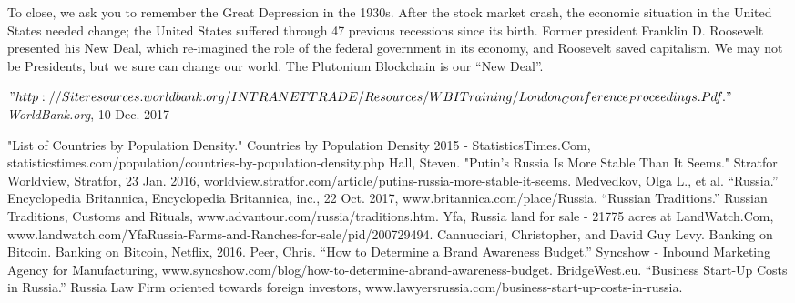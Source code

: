 \documentclass[12pt]{article}
\begin{document}
To close, we ask you to remember the Great Depression in the 1930s. After the stock market crash, the economic situation in the United States needed change; the United States suffered through 47 previous recessions since its birth. Former president Franklin D. Roosevelt presented his New Deal, which re-imagined the role of the federal government in its economy, and Roosevelt saved capitalism. We may not be Presidents, but we sure can change our world. The Plutonium Blockchain is our ``New Deal''.
\pagebreak
\begin{thebibliography}{10}
\tiny $"http://Siteresources.worldbank.org/INTRANETTRADE/Resources/WBITraining/London_Conference_Proceedings.Pdf."$ \normalsize \textit{WorldBank.org}, 10 Dec. 2017
 
 "List of Countries by Population Density." Countries by Population Density 2015 -
StatisticsTimes.Com, \tiny statisticstimes.com/population/countries-by-population-density.php
 \normalsize
{} 
Hall, Steven. "Putin's Russia Is More Stable Than It Seems." Stratfor Worldview, Stratfor,
23 Jan. 2016, \tiny worldview.stratfor.com/article/putins-russia-more-stable-it-seems.
\normalsize
{}
Medvedkov, Olga L., et al. ``Russia.'' Encyclopedia Britannica, Encyclopedia Britannica,
inc., 22 Oct. 2017, \tiny www.britannica.com/place/Russia.
\normalsize
{}
``Russian Traditions.'' Russian Traditions, Customs and Rituals,
\tiny www.advantour.com/russia/traditions.htm.
\normalsize
{}
Yfa, Russia land for sale - 21775 acres at LandWatch.Com, \tiny www.landwatch.com/YfaRussia-Farms-and-Ranches-for-sale/pid/200729494.
\normalsize
{}
Cannucciari, Christopher, and David Guy Levy. Banking on Bitcoin. Banking on Bitcoin,
Netflix, 2016.
Peer, Chris. “How to Determine a Brand Awareness Budget.” Syncshow - Inbound
Marketing Agency for Manufacturing, \tiny www.syncshow.com/blog/how-to-determine-abrand-awareness-budget.
\normalsize
{}
BridgeWest.eu. “Business Start-Up Costs in Russia.” Russia Law Firm oriented towards
foreign investors, \tiny www.lawyersrussia.com/business-start-up-costs-in-russia.
\end{thebibliography}
\end{document}
